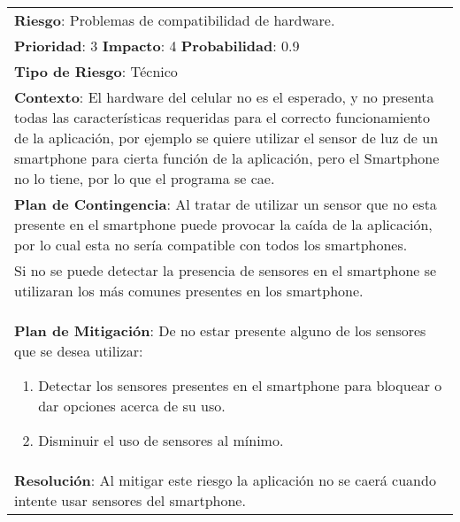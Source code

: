 \begin{table}[htbp!]
  \begin{tabular}{|p{15cm}|}\hline
    {\bf Riesgo}: Problemas de compatibilidad de hardware.\\%
    {\bf Prioridad}: 3  {\bf Impacto}: 4  {\bf Probabilidad}: 0.9\\%
    {\bf Tipo de Riesgo}: T\'ecnico\\%
    {\bf Contexto}: El hardware del celular no es el esperado, y no presenta todas las caracter\'isticas requeridas para el correcto funcionamiento de la aplicaci\'on, por ejemplo se quiere utilizar el sensor de luz de un smartphone para cierta funci\'on de la aplicaci\'on, pero el Smartphone no lo tiene, por lo que el programa se cae.\\%
    {\bf Plan de Contingencia}: Al tratar de utilizar un sensor que no esta presente en el smartphone puede provocar la ca\'ida de la aplicaci\'on, por lo cual esta no ser\'ia compatible con todos los smartphones.\\Si no se puede detectar la presencia de sensores en el smartphone se utilizaran los m\'as comunes presentes en los smartphone.\\%
    {\bf Plan de Mitigaci\'on}: De no estar presente alguno de los sensores que se desea utilizar:\begin{enumerate}\item Detectar los sensores presentes en el smartphone  para bloquear o dar opciones acerca de su uso.\item Disminuir el uso de sensores al m\'inimo.\end{enumerate}\\%
    {\bf Resoluci\'on}: Al mitigar este riesgo la aplicaci\'on no se caer\'a cuando intente usar sensores del smartphone.\\\hline
  \end{tabular}
  \caption{}
  \label{table:R2}
\end{table}



